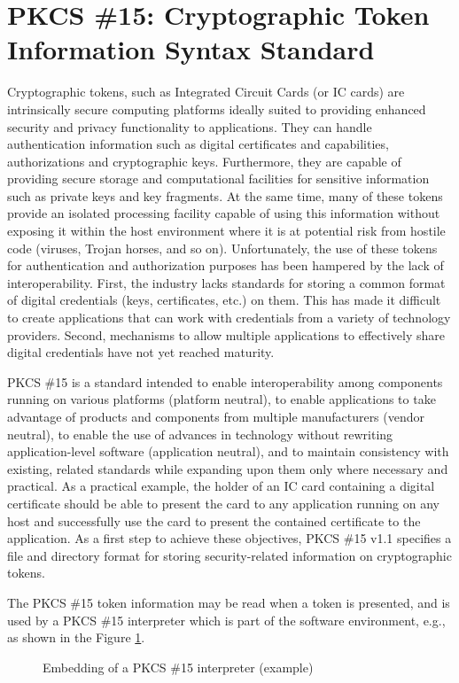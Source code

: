 \documentclass{article}
\begin{document}
\section{PKCS \#15: Cryptographic Token Information Syntax Standard}
\label{pkcs15}
Cryptographic tokens, such as Integrated Circuit Cards (or IC cards) 
are intrinsically secure computing platforms ideally suited to 
providing enhanced security and privacy functionality to applications. 
They can handle authentication information such as digital certificates 
and capabilities, authorizations and cryptographic keys. Furthermore, 
they are capable of providing secure storage and computational facilities 
for sensitive information such as private keys and key fragments.
At the same time, many of these tokens provide an isolated processing 
facility capable of using this information without exposing it within 
the host environment where it is at potential risk from hostile code 
(viruses, Trojan horses, and so on). Unfortunately, the use of these 
tokens for authentication and authorization purposes 
has been hampered by the lack of interoperability. 
First, the industry lacks standards for storing a common 
format of digital credentials (keys, certificates, etc.) on them. 
This has made it difficult to create applications that can work with 
credentials from a variety of technology providers. 
Second, mechanisms to allow multiple applications to 
effectively share digital credentials have not yet reached maturity. 

PKCS \#15 is a standard intended to enable 
interoperability among components running on various platforms 
(platform neutral), to
enable applications to take advantage of products and components 
from multiple manufacturers (vendor neutral), to 
enable the use of advances in technology without rewriting 
application-level software (application neutral), and
to maintain consistency with existing, related standards while expanding upon
 them only where necessary and practical.
As a practical example, the holder of an IC card containing a digital 
certificate should be able to present the card to any application 
running on any host and successfully use the card to present the 
contained certificate to the application. 
As a first step to achieve these objectives, 
PKCS \#15 v1.1 specifies a file and 
directory format for storing security-related information on 
cryptographic tokens. 

The PKCS \#15 token information may be read when a token 
is presented, and is used by a PKCS \#15 
interpreter which is part of the software environment, e.g., as shown in
the Figure \ref{pkcs15fig1}.
\begin{center}
\begin{figure}[htb]
\caption{Embedding of a PKCS \#15 interpreter (example)}
\label{pkcs15fig1}
\end{figure}
\end{center}
\end{document}

